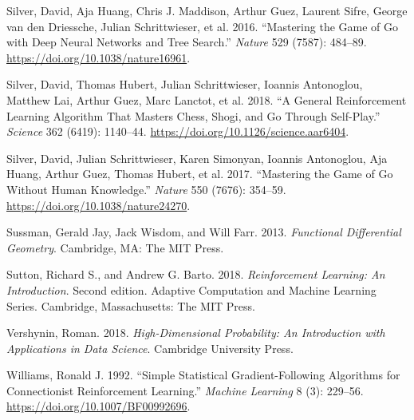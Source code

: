 \documentclass[
  letterpaper,
  DIV=11,
  numbers=noendperiod]{scrreprt}
\newlength{\cslhangindent}
\newenvironment{CSLReferences}[2] %
 {\begin{list}{}{%
  \setlength{\itemindent}{0pt}
  \setlength{\leftmargin}{0pt}
  \setlength{\parsep}{0pt}
  \ifodd #1
   \setlength{\leftmargin}{\cslhangindent}
   \setlength{\itemindent}{-1\cslhangindent}
  \fi
  \setlength{\itemsep}{#2\baselineskip}}}
 {\end{list}}
\theoremstyle{plain}
\theoremstyle{plain}
\theoremstyle{definition}
\theoremstyle{definition}
\theoremstyle{remark}
\begin{document}
\begin{CSLReferences}{1}{0}
Silver, David, Aja Huang, Chris J. Maddison, Arthur Guez, Laurent Sifre,
George van den Driessche, Julian Schrittwieser, et al. 2016.
{``Mastering the Game of {Go} with Deep Neural Networks and Tree
Search.''} \emph{Nature} 529 (7587): 484--89.
\url{https://doi.org/10.1038/nature16961}.

Silver, David, Thomas Hubert, Julian Schrittwieser, Ioannis Antonoglou,
Matthew Lai, Arthur Guez, Marc Lanctot, et al. 2018. {``A General
Reinforcement Learning Algorithm That Masters Chess, Shogi, and {Go}
Through Self-Play.''} \emph{Science} 362 (6419): 1140--44.
\url{https://doi.org/10.1126/science.aar6404}.

Silver, David, Julian Schrittwieser, Karen Simonyan, Ioannis Antonoglou,
Aja Huang, Arthur Guez, Thomas Hubert, et al. 2017. {``Mastering the
Game of {Go} Without Human Knowledge.''} \emph{Nature} 550 (7676):
354--59. \url{https://doi.org/10.1038/nature24270}.

Sussman, Gerald Jay, Jack Wisdom, and Will Farr. 2013. \emph{Functional
Differential Geometry}. Cambridge, MA: The MIT Press.

Sutton, Richard S., and Andrew G. Barto. 2018. \emph{Reinforcement
Learning: An Introduction}. Second edition. Adaptive Computation and
Machine Learning Series. Cambridge, Massachusetts: The MIT Press.

Vershynin, Roman. 2018. \emph{High-{Dimensional Probability}: {An
Introduction} with {Applications} in {Data Science}}. Cambridge
University Press.

Williams, Ronald J. 1992. {``Simple Statistical Gradient-Following
Algorithms for Connectionist Reinforcement Learning.''} \emph{Machine
Learning} 8 (3): 229--56. \url{https://doi.org/10.1007/BF00992696}.

\end{CSLReferences}
\end{document}
